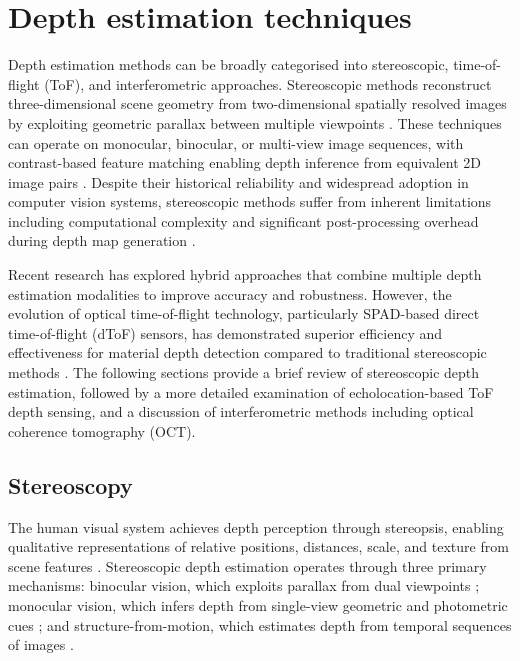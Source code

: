 \documentclass[12pt,a4paper,oneside]{report}
\let\oldsection\section
\renewcommand{\section}{\clearpage\oldsection}
\begin{document}
\newpage
\section{Depth estimation techniques}
\label{sec:depth_estimation_techniques}

Depth estimation methods can be broadly categorised into stereoscopic, time-of-flight (ToF), and interferometric approaches. Stereoscopic methods reconstruct three-dimensional scene geometry from two-dimensional spatially resolved images by exploiting geometric parallax between multiple viewpoints \cite{laga2022,hu2020,godard2019}. These techniques can operate on monocular, binocular, or multi-view image sequences, with contrast-based feature matching enabling depth inference from equivalent 2D image pairs \cite{rock2015}. Despite their historical reliability and widespread adoption in computer vision systems, stereoscopic methods suffer from inherent limitations including computational complexity and significant post-processing overhead during depth map generation \cite{bass2010,laga2022}.

Recent research has explored hybrid approaches that combine multiple depth estimation modalities to improve accuracy and robustness. However, the evolution of optical time-of-flight technology, particularly SPAD-based direct time-of-flight (dToF) sensors, has demonstrated superior efficiency and effectiveness for material depth detection compared to traditional stereoscopic methods \cite{mcmanamon2019}. The following sections provide a brief review of stereoscopic depth estimation, followed by a more detailed examination of echolocation-based ToF depth sensing, and a discussion of interferometric methods including optical coherence tomography (OCT).

\subsection{Stereoscopy}
\label{subsec:stereoscopy}

The human visual system achieves depth perception through stereopsis, enabling qualitative representations of relative positions, distances, scale, and texture from scene features \cite{pizlo2001,wheatstone1838}. Stereoscopic depth estimation operates through three primary mechanisms: binocular vision, which exploits parallax from dual viewpoints \cite{hu2020,wheatstone1838}; monocular vision, which infers depth from single-view geometric and photometric cues \cite{godard2019}; and structure-from-motion, which estimates depth from temporal sequences of images \cite{schonberger2016}.
\end{document}
